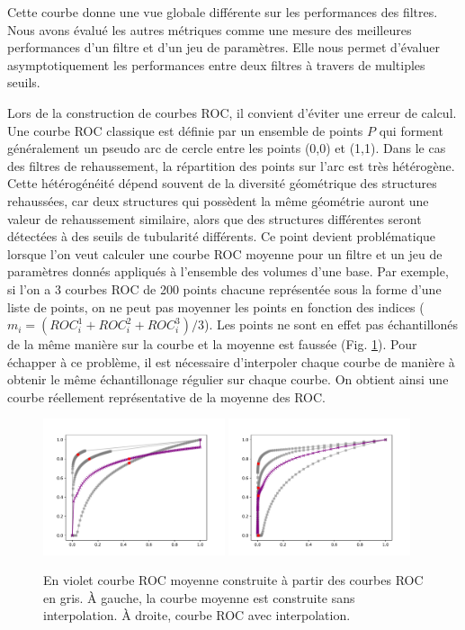 Cette courbe donne une vue globale différente sur les performances des filtres. Nous avons évalué les autres métriques comme une mesure des meilleures performances d'un filtre et d'un jeu de paramètres. Elle nous permet d'évaluer asymptotiquement les performances entre deux filtres à travers de multiples seuils.

Lors de la construction de courbes ROC, il convient d'éviter une erreur de calcul. Une courbe ROC classique est définie par un ensemble de points $P$ qui forment généralement un pseudo arc de cercle entre les points (0,0) et (1,1). Dans le cas des filtres de rehaussement, la répartition des points sur l'arc est très hétérogène. Cette hétérogénéité dépend souvent de la diversité géométrique des structures rehaussées, car deux structures qui possèdent la même géométrie auront une valeur de rehaussement similaire, alors que des structures différentes seront détectées à des seuils de tubularité différents. Ce point devient problématique lorsque l'on veut calculer une courbe ROC moyenne pour un filtre et un jeu de paramètres donnés appliqués à l'ensemble des volumes d'une base. Par exemple, si l'on a 3 courbes ROC de 200 points chacune représentée sous la forme d'une liste de points, on ne peut pas moyenner les points en fonction des indices ( $m_i = (ROC^1_{i} + ROC^2_{i} + ROC^3_{i})/3 $). Les points ne sont en effet pas échantillonés de la même manière sur la courbe et la moyenne est faussée (Fig. \ref{fig:good_and_bad_roc}). Pour échapper à ce problème, il est nécessaire d'interpoler chaque courbe de manière à obtenir le même échantillonage régulier sur chaque courbe. On obtient ainsi une courbe réellement représentative de la moyenne des ROC.


\begin{figure}[ht]
  \centering
  \includegraphics[height=4cm]{Images/ROC_badMean.pdf}
  \includegraphics[height=4cm]{Images/ROC_goodMean.pdf}
  \caption{En violet courbe ROC moyenne construite à partir des courbes ROC en gris. À gauche, la courbe moyenne est construite sans interpolation. À droite, courbe ROC avec interpolation.}
  \label{fig:good_and_bad_roc}
\end{figure}

